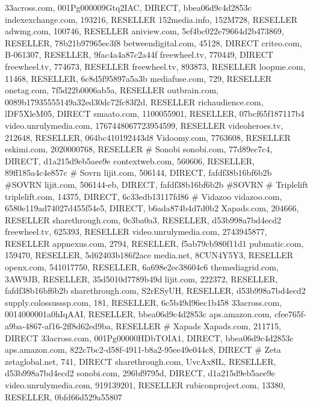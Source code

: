 33across.com, 001Pg000009Gtq2IAC, DIRECT, bbea06d9c4d2853c
indexexchange.com, 193216, RESELLER
152media.info, 152M728, RESELLER
adwmg.com, 100746, RESELLER
aniview.com, 5ef4bc022e79664d2b473869, RESELLER, 78b21b97965ec3f8
betweendigital.com, 45128, DIRECT
criteo.com, B-061307, RESELLER, 9fac4a4a87c2a44f
freewheel.tv, 770449, DIRECT
freewheel.tv, 774673, RESELLER
freewheel.tv, 893873, RESELLER
loopme.com, 11468, RESELLER, 6c8d5f95897a5a3b
mediafuse.com, 729, RESELLER
onetag.com, 7f5d22b0006ab5a, RESELLER
outbrain.com, 0089b17935555149a32ed30dc72fc83f2d, RESELLER
richaudience.com, lDF5XleM05, DIRECT
smaato.com, 1100055901, RESELLER, 07bcf65f187117b4
video.unrulymedia.com, 1767448067723954599, RESELLER
videoheroes.tv, 212648, RESELLER, 064bc410192443d8
Vidoomy.com, 7763608, RESELLER
eskimi.com, 2020000768, RESELLER
# Sonobi
sonobi.com, 77d89ec7c4, DIRECT, d1a215d9eb5aee9e
contextweb.com, 560606, RESELLER, 89ff185a4c4e857c
# Sovrn
lijit.com, 506144, DIRECT, fafdf38b16bf6b2b #SOVRN
lijit.com, 506144-eb, DIRECT, fafdf38b16bf6b2b #SOVRN
# Triplelift
triplelift.com, 14375, DIRECT, 6c33edb13117fd86
# Vidazoo
vidazoo.com, 6580e119ad74027d455f54e5, DIRECT, b6ada874b4d7d0b2
Xapads.com, 204666, RESELLER
sharethrough.com, 0c3ba0a3, RESELLER, d53b998a7bd4ecd2
freewheel.tv, 625393, RESELLER
video.unrulymedia.com, 2743945877, RESELLER
appnexus.com, 2794, RESELLER, f5ab79cb980f11d1
pubmatic.com, 159470, RESELLER, 5d62403b186f2ace
media.net, 8CUN4Y5Y3, RESELLER
openx.com, 541017750, RESELLER, 6a698e2ec38604c6
themediagrid.com, 3AW9JB, RESELLER, 35d5010d7789b49d
lijit.com, 222372, RESELLER, fafdf38b16bf6b2b
sharethrough.com, S2rESyUH, RESELLER, d53b998a7bd4ecd2
supply.colossusssp.com, 181, RESELLER, 6c5b49d96ec1b458
33across.com, 0014000001a0hIqAAI, RESELLER, bbea06d9c4d2853c
aps.amazon.com, cfee765f-a9ba-4867-af16-2ff8d62ed9ba, RESELLER
# Xapads
Xapads.com, 211715, DIRECT
33across.com, 001Pg00000HDbTOIA1, DIRECT, bbea06d9c4d2853c
aps.amazon.com, 822c7bc2-d58f-4911-b8a2-95ee49e044c8, DIRECT
# Zeta
zetaglobal.net, 741, DIRECT
sharethrough.com, UvcAx8IL, RESELLER, d53b998a7bd4ecd2
sonobi.com, 296bf9795d, DIRECT, d1a215d9eb5aee9e
video.unrulymedia.com, 919139201, RESELLER
rubiconproject.com, 13380, RESELLER, 0bfd66d529a55807
